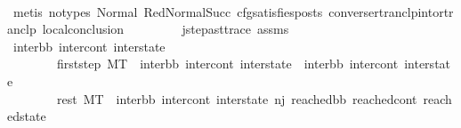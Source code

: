 \begin{isabellebody}
\ \ \ \ \ \ \ \ \isamarkupfalse%
\ {\isacharparenleft}{\kern0pt}metis\ {\isacharparenleft}{\kern0pt}no{\isacharunderscore}{\kern0pt}types{\isacharparenright}{\kern0pt}\ Normal\ RedNormalSucc\ cfg{\isacharunderscore}{\kern0pt}satisfies{\isacharunderscore}{\kern0pt}posts\ converse{\isacharunderscore}{\kern0pt}rtranclp{\isacharunderscore}{\kern0pt}into{\isacharunderscore}{\kern0pt}rtranclp\ local{\isacharunderscore}{\kern0pt}conclusion{\isacharparenright}{\kern0pt}\isanewline
\isanewline
\ \ \ \ \ \ \isamarkupfalse%
\ {}\ j{\isacharunderscore}{\kern0pt}step{\isacharunderscore}{\kern0pt}ast{\isacharunderscore}{\kern0pt}trace\ assms{\isacharparenleft}{\kern0pt}{}{\isacharparenright}{\kern0pt}\ \isamarkupfalse%
\ inter{\isacharunderscore}{\kern0pt}bb{}\ inter{\isacharunderscore}{\kern0pt}cont{}\ inter{\isacharunderscore}{\kern0pt}state{}\ \isanewline
\ \ \ \ \ \ \ \ first{\isacharunderscore}{\kern0pt}step{\isacharunderscore}{\kern0pt}{}{\isacharcolon}{\kern0pt}\ {\isachardoublequoteopen}M{\isacharcomma}{\kern0pt}{\isasymLambda}{\isacharcomma}{\kern0pt}{\isasymGamma}{\isacharcomma}{\kern0pt}{\isasymOmega}{\isacharcomma}{\kern0pt}T\ {\isasymturnstile}\ {\isasymlangle}{\isacharparenleft}{\kern0pt}inter{\isacharunderscore}{\kern0pt}bb{\isacharcomma}{\kern0pt}\ inter{\isacharunderscore}{\kern0pt}cont{\isacharcomma}{\kern0pt}\ inter{\isacharunderscore}{\kern0pt}state{\isacharparenright}{\kern0pt}{\isasymrangle}\ {\isasymlongrightarrow}\ {\isacharparenleft}{\kern0pt}inter{\isacharunderscore}{\kern0pt}bb{}{\isacharcomma}{\kern0pt}\ inter{\isacharunderscore}{\kern0pt}cont{}{\isacharcomma}{\kern0pt}\ inter{\isacharunderscore}{\kern0pt}state{}{\isacharparenright}{\kern0pt}{\isachardoublequoteclose}\ \ \isanewline
\ \ \ \ \ \ \ \ rest{\isacharunderscore}{\kern0pt}{}{\isacharcolon}{\kern0pt}\ {\isachardoublequoteopen}M{\isacharcomma}{\kern0pt}{\isasymLambda}{\isacharcomma}{\kern0pt}{\isasymGamma}{\isacharcomma}{\kern0pt}{\isasymOmega}{\isacharcomma}{\kern0pt}T\ {\isasymturnstile}\ {\isacharparenleft}{\kern0pt}inter{\isacharunderscore}{\kern0pt}bb{}{\isacharcomma}{\kern0pt}\ inter{\isacharunderscore}{\kern0pt}cont{}{\isacharcomma}{\kern0pt}\ inter{\isacharunderscore}{\kern0pt}state{}{\isacharparenright}{\kern0pt}\ {\isacharminus}{\kern0pt}n{\isasymlongrightarrow}{\isacharcircum}{\kern0pt}j{\isacharprime}{\kern0pt}{\isacharprime}{\kern0pt}\ {\isacharparenleft}{\kern0pt}reached{\isacharunderscore}{\kern0pt}bb{\isacharcomma}{\kern0pt}\ reached{\isacharunderscore}{\kern0pt}cont{\isacharcomma}{\kern0pt}\ reached{\isacharunderscore}{\kern0pt}state{\isacharparenright}{\kern0pt}{\isachardoublequoteclose}\isanewline

\end{isabellebody}
